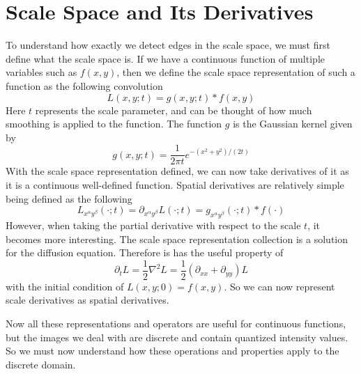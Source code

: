 \documentclass{article}
\begin{document}
\section{Scale Space and Its Derivatives}
To understand how exactly we detect edges in the scale space, we must first define what the scale space is.
If we have a continuous function of multiple variables such as $f(x,y)$, then we define the scale space representation of such a function as the following convolution
\begin{equation}
  L(x,y;t) = g(x,y;t) * f(x,y)
\end{equation}
Here $t$ represents the scale parameter, and can be thought of how much smoothing is applied to the function. The function $g$ is the Gaussian kernel given by
\begin{equation}
  g(x,y;t) = \frac{1}{2 \pi t}e^{-(x^2+y^2)/(2t)}
\end{equation}
With the scale space representation defined, we can now take derivatives of it as it is a continuous well-defined function.
Spatial derivatives are relatively simple being defined as the following
\begin{equation}
  L_{x^{\alpha}y^{\beta}}(\cdot;t) = \partial_{x^{\alpha}y^{\beta}}L(\cdot;t) = g_{x^{\alpha}y^{\beta}}(\cdot;t) * f(\cdot)
\end{equation}
However, when taking the partial derivative with respect to the scale $t$, it becomes more interesting.
The scale space representation collection is a solution for the diffusion equation. Therefore is has the useful property of \cite{Lindeberg1993}
\begin{equation}
  \partial_t L = \frac{1}{2} \nabla^2 L = \frac{1}{2} (\partial_{xx} + \partial_{yy})L
\end{equation}
with the initial condition of $L(x,y;0) = f(x,y)$.
So we can now represent scale derivatives as spatial derivatives. 

Now all these representations and operators are useful for continuous functions, but the images we deal with are discrete and contain quantized intensity values.
So we must now understand how these operations and properties apply to the discrete domain.
\end{document}
